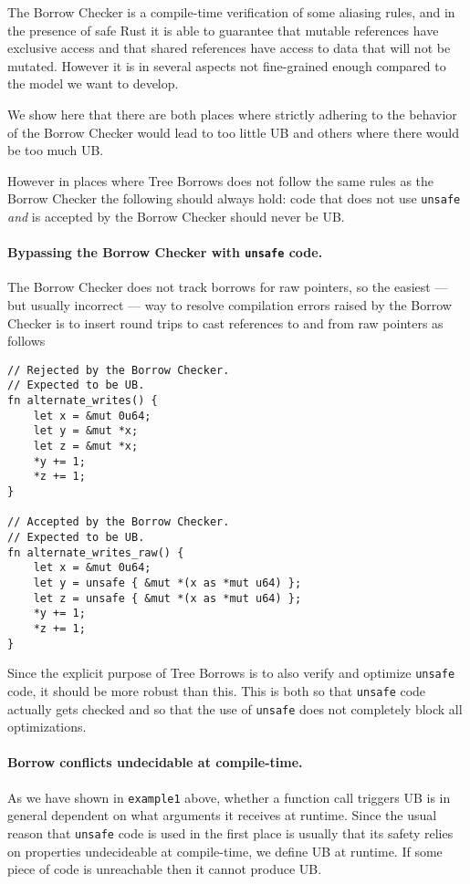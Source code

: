 \documentclass[a4paper,11pt]{article}
\theoremstyle{plain}
\theoremstyle{definition}
\theoremstyle{remark}
\begin{document}
The Borrow Checker is a compile-time verification of some aliasing rules, and
in the presence of safe Rust it is able to guarantee that mutable references
have exclusive access and that shared references have access to data that will
not be mutated. However it is in several aspects not fine-grained enough compared
to the model we want to develop.

We show here that there are both places where strictly adhering to the behavior
of the Borrow Checker would lead to too little UB and others where there would
be too much UB.

However in places where Tree Borrows does not follow the same rules as the
Borrow Checker the following should always hold: code that does not use
\texttt{unsafe} \textit{and} is accepted by the Borrow Checker should never
be UB.

\paragraph*{Bypassing the Borrow Checker with \texttt{unsafe} code.}
The Borrow Checker does not track borrows for raw pointers, so the easiest
--- but usually incorrect --- way to resolve compilation errors raised by the
Borrow Checker is to insert round trips to cast references to and from raw
pointers as follows
\begin{lstlisting}
// Rejected by the Borrow Checker.
// Expected to be UB.
fn alternate_writes() {
    let x = &mut 0u64;
    let y = &mut *x;
    let z = &mut *x;
    *y += 1;
    *z += 1;
}

// Accepted by the Borrow Checker.
// Expected to be UB.
fn alternate_writes_raw() {
    let x = &mut 0u64;
    let y = unsafe { &mut *(x as *mut u64) };
    let z = unsafe { &mut *(x as *mut u64) };
    *y += 1;
    *z += 1;
}
\end{lstlisting}

Since the explicit purpose of Tree Borrows is to also verify and optimize
\texttt{unsafe} code, it should be more robust than this. This is both so that
\texttt{unsafe} code actually gets checked and so that the use of \texttt{unsafe}
does not completely block all optimizations.

\paragraph*{Borrow conflicts undecidable at compile-time.}
As we have shown in \texttt{example1} above, whether a function call triggers
UB is in general dependent on what arguments it receives at runtime. Since the
usual reason that \texttt{unsafe} code is used in the first place is usually
that its safety relies on properties undecideable at compile-time, we define
UB at runtime. If some piece of code is unreachable then it cannot produce UB.
\end{document}
